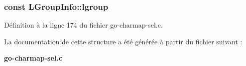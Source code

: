\subsubsection[{lgroup}]{ const {\bf LGroupInfo::lgroup}}\label{structLGroupInfo_ac64bc610640dad9a0db5729f0f5b6a4d}


Définition à la ligne 174 du fichier go-\/charmap-\/sel.c.



La documentation de cette structure a été générée à partir du fichier suivant :\begin{DoxyCompactItemize}
\item 
{\bf go-\/charmap-\/sel.c}\end{DoxyCompactItemize}
